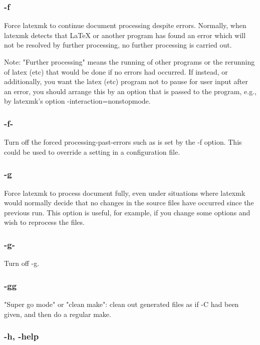 \subsubsection{-f}

Force latexmk to continue document  processing  despite  errors.  Normally,
when latexmk detects that LaTeX or another program has found an error which
will not be resolved by further processing, no further processing is carried
out.

Note:  "Further  processing" means the running of other programs or the
rerunning of latex (etc) that would be done if no  errors had  occurred.   If
instead, or additionally, you want the latex (etc) program not to pause for
user input after  an  error,  you should  arrange this by an option that is
passed to the program, e.g., by latexmk's option -interaction=nonstopmode.


\subsubsection{-f-}

Turn off the forced processing-past-errors such as is set by the -f  option.
This could be used to override a setting in a configuration file.


\subsubsection{-g}

Force latexmk to process document fully, even  under  situations
where  latexmk  would  normally  decide  that  no changes in the
source files have occurred since the previous run.  This  option
is  useful,  for example, if you change some options and wish to
reprocess the files.

\subsubsection{-g-}

Turn off -g.

\subsubsection{-gg}

"Super go mode" or "clean make": clean out generated files as if -C had been
given, and then do a regular make.

\subsubsection{-h, -help}

